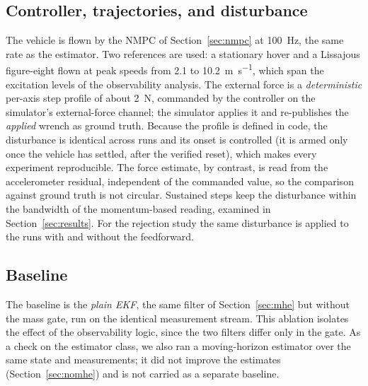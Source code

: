\documentclass[lettersize,journal]{IEEEtran}
\begin{document}
\subsection{Controller, trajectories, and disturbance}
The vehicle is flown by the NMPC of Section~\ref{sec:nmpc} at \SI{100}{\hertz},
the same rate as the estimator. Two references are used: a
stationary hover and a Lissajous figure-eight flown at peak speeds from
\SI{2.1}{} to \SI{10.2}{\meter\per\second}, which span the excitation levels of
the observability analysis. The external force is a \emph{deterministic} per-axis
step profile of about \SI{2}{\newton}, commanded by the controller on the
simulator's external-force channel; the simulator applies it and re-publishes the
\emph{applied} wrench as ground truth. Because the profile is defined in code, the
disturbance is identical across runs and its onset is controlled (it is armed only
once the vehicle has settled, after the verified reset), which makes every
experiment reproducible. The force estimate, by contrast, is read from the
accelerometer residual, independent of the commanded value, so the comparison
against ground truth is not circular. Sustained steps keep the disturbance within
the bandwidth of the momentum-based reading, examined in
Section~\ref{sec:results}. For the rejection study the same disturbance is applied
to the runs with and without the feedforward.

\subsection{Baseline}
The baseline is the \emph{plain EKF}, the same filter of Section~\ref{sec:mhe}
but without the mass gate, run on the identical measurement stream. This
ablation isolates the effect of the observability logic, since the two filters
differ only in the gate. As a check on the estimator class, we also ran a
moving-horizon estimator over the same state and measurements; it did not improve
the estimates (Section~\ref{sec:nomhe}) and is not carried as a separate
baseline.
\end{document}

